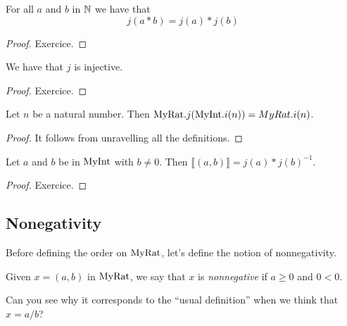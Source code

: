 \begin{lemma}
    \label{MyRat.j_mul}
    \leanok
For all $a$ and $b$ in $\mathbb{N}$ we have that
\[
j(a*b) = j(a) * j(b)
\]
\end{lemma}
\begin{proof}
    \leanok
Exercice.
\end{proof}

\begin{lemma}
    \label{MyRat.j_injective}
    \leanok
    We have that $j$ is injective.
\end{lemma}
\begin{proof}
    \leanok
Exercice.
\end{proof}

\begin{lemma}
    \label{MyRat.j_comp_eq_i}
    \leanok
    Let $n$ be a natural number. Then $\mathrm{MyRat}.j (\mathrm{MyInt}.i (n)) = MyRat.i (n)$.
\end{lemma}
\begin{proof}
    \leanok
It follows from unravelling all the definitions.
\end{proof}

\begin{lemma}
    \label{MyRat.Quotient.mk_def}
    \leanok
    Let $a$ and $b$ be in $\mathrm{MyInt}$ with $b \neq 0$. Then $\llbracket (a, b) \rrbracket = j(a)*j(b)^{-1}$.
\end{lemma}
\begin{proof}
    \leanok
Exercice.
\end{proof}

\subsection{Nonegativity}

Before defining the order on $\mathrm{MyRat}$, let's define the notion of nonnegativity.

\begin{definition}
    \label{MyRat.IsNonneg}
    \leanok
Given $x = (a,b)$ in $\mathrm{MyRat}$, we say that $x$ is \emph{nonnegative} if $a \geq 0$ and $0 < 0$.

Can you see why it corresponds to the ``usual definition'' when we think that $x = a/b$?
\end{definition}

